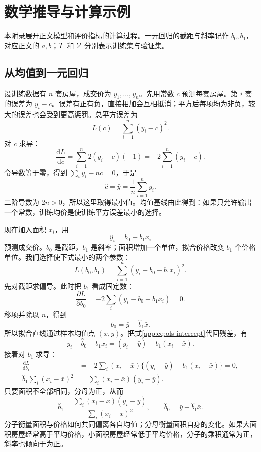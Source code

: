 \section{数学推导与计算示例}\label{app:math}
本附录展开正文模型和评价指标的计算过程。一元回归的截距与斜率记作 $b_0,b_1$，对应正文的 $a,b$；$\mathcal{T}$ 和 $\mathcal{V}$ 分别表示训练集与验证集。

\subsection{从均值到一元回归}
设训练数据有 $n$ 套房屋，成交价为 $y_1,\ldots,y_n$。先用常数 $c$ 预测每套房屋。第 $i$ 套的误差为 $y_i-c$。误差有正有负，直接相加会互相抵消；平方后每项均为非负，较大的误差也会受到更高惩罚。总平方误差为
\begin{equation}
L(c)=\sum_{i=1}^{n}(y_i-c)^2.
\end{equation}
对 $c$ 求导：
\[
\frac{\mathrm dL}{\mathrm dc}
=\sum_{i=1}^{n}2(y_i-c)(-1)
=-2\sum_{i=1}^{n}(y_i-c).
\]
令导数等于零，得到 $\sum_i y_i-nc=0$，于是
\begin{equation}\label{app:eq:constant}
\hat c=\bar y=\frac1n\sum_{i=1}^{n}y_i.
\end{equation}
二阶导数为 $2n>0$，所以这里取得最小值。均值基线由此得到：如果只允许输出一个常数，训练均价是使训练平方误差最小的选择。

现在加入面积 $x_i$，用
\begin{equation}\label{app:eq:line}
\hat y_i=b_0+b_1x_i
\end{equation}
预测成交价。$b_0$ 是截距，$b_1$ 是斜率；面积增加一个单位，拟合价格改变 $b_1$ 个价格单位。我们选择使下式最小的两个参数：
\begin{equation}\label{app:eq:ols-loss}
L(b_0,b_1)=\sum_{i=1}^{n}(y_i-b_0-b_1x_i)^2.
\end{equation}
先对截距求偏导。此时把 $b_1$ 看成固定数：
\[
\frac{\partial L}{\partial b_0}
=-2\sum_i(y_i-b_0-b_1x_i)=0.
\]
移项并除以 $n$，得到
\begin{equation}\label{app:eq:ols-intercept}
\hat b_0=\bar y-\hat b_1\bar x.
\end{equation}
所以拟合直线通过样本均值点 $(\bar x,\bar y)$。把式\eqref{app:eq:ols-intercept}代回残差，有
\[
y_i-\hat b_0-b_1x_i=(y_i-\bar y)-b_1(x_i-\bar x).
\]
接着对 $b_1$ 求导：
\begin{align*}
\frac{\mathrm dL}{\mathrm db_1}
&=-2\sum_i(x_i-\bar x)\{(y_i-\bar y)-b_1(x_i-\bar x)\}=0,\\
\hat b_1\sum_i(x_i-\bar x)^2
&=\sum_i(x_i-\bar x)(y_i-\bar y).
\end{align*}
只要面积不全部相同，分母为正，从而
\begin{equation}\label{app:eq:ols-slope}
\hat b_1=
\frac{\sum_i(x_i-\bar x)(y_i-\bar y)}{\sum_i(x_i-\bar x)^2},
\qquad \hat b_0=\bar y-\hat b_1\bar x.
\end{equation}
分子衡量面积与价格如何共同偏离各自均值；分母衡量面积自身的变化。如果大面积房屋经常高于平均价格，小面积房屋经常低于平均价格，分子的乘积通常为正，斜率也倾向于为正。

